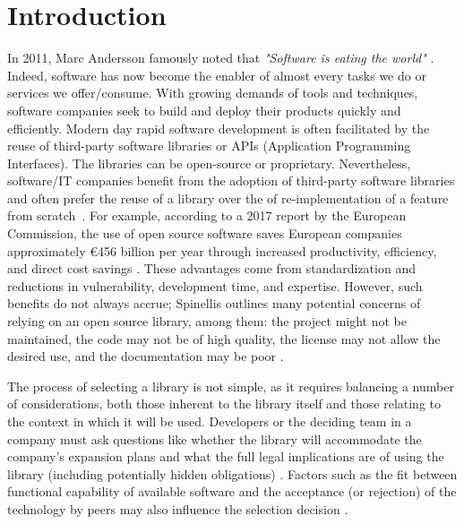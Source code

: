 \documentclass[sigconf,review,anonymous, table]{acmart}
\begin{document}
\maketitle
\balance
\section{Introduction}
In 2011, Marc Andersson famously noted that \textit{"Software is eating the world"} \cite{website:eat-world}. Indeed, software has now become the enabler of almost every tasks we do or services we offer/consume. With growing demands of tools and techniques, software companies seek to build and deploy their products quickly and efficiently. Modern day rapid software development is often facilitated by the reuse of third-party software libraries or APIs (Application Programming Interfaces). The libraries can be open-source or proprietary. Nevertheless, software/IT companies benefit from the adoption of third-party software libraries and often prefer the reuse of a library over the of re-implementation of a feature from scratch~\cite{uddin2017opiner}. For example, according to a 2017 report by the European Commission, the use of open source software saves European companies approximately \euro456 billion per year through increased productivity, efficiency, and direct cost savings \cite{eu2017economic}. These advantages come from standardization and reductions in vulnerability, development time, and expertise. However, such benefits do not always accrue; Spinellis outlines many potential concerns of relying on an open source library, among them: the project might not be maintained, the code may not be of high quality, the license may not allow the desired use, and the documentation may be poor \cite{spinellis2019select}.

The process of selecting a library is not simple, as it requires balancing a number of considerations, both those inherent to the library itself and those relating to the context in which it will be used. Developers or the deciding team in a company must ask questions like whether the library will accommodate the company's expansion plans and what the full legal implications are of using the library (including potentially hidden obligations) 
\cite{spinellis2019select,wolter:2022:open}. Factors such as the fit between functional capability of available software and the acceptance (or rejection) of the technology by peers may also influence the selection decision \cite{dishaw1998supporting,eckhardt2009influences}. %
\end{document}
